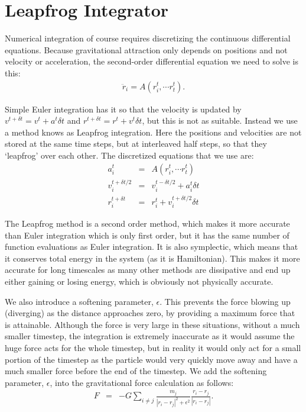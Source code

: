 \documentclass[11pt]{article}
\begin{document}
\section{Leapfrog Integrator}
Numerical integration of course requires discretizing the continuous differential equations.  
Because gravitational attraction only depends on positions and not velocity or acceleration, the second-order differential equation we need to solve is this:
\begin{eqnarray}
	\ddot r_i = A(r_i^t, \cdots r_t^t).
\end{eqnarray}

Simple Euler integration has it so that the velocity is updated by $v^{t+\delta t} = v^{t} + a^{t} \delta t$ and $r^{t+\delta t} = r^{t} + v^{t} \delta t$, but this is not as suitable.
Instead we use a method knows as Leapfrog integration.
Here the positions and velocities are not stored at the same time steps, but at interleaved half steps, so that  they `leapfrog' over each other.
The discretized equations that we use are:
\begin{eqnarray}
	a_i^t &=& A(r_i^t, \cdots r_t^t) \\
	v_i^{t+\delta t/2} &=& v_i^{t-\delta t/2} + a_i^t \delta t \\
	r_i^{t+\delta t} &=& r_i^t + v_i^{t+\delta t/2} \delta t
\end{eqnarray}

The Leapfrog method is a second order method, which makes it more accurate than Euler integration which is only first order, but it has the same number of function evaluations as Euler integration.
It is also symplectic, which means that it conserves total energy in the system (as it is Hamiltonian).
This makes it more accurate for long timescales as many other methods are dissipative and end up either gaining or losing energy, which is obviously not physically accurate.

We also introduce a softening parameter, $\epsilon$.
This prevents the force blowing up (diverging) as the distance approaches zero, by providing a maximum force that is attainable.
Although the force is very large in these situations, without a much smaller timestep, the integration is extremely inaccurate as it would assume the huge force acts for the whole timestep, but in reality it would only act for a small portion of the timestep as the particle would very quickly move away and have a much smaller force before the end of the timestep.
We add the softening parameter, $\epsilon$, into the gravitational force calculation as follows:
\begin{eqnarray}
	F &=& -G \sum_{i \neq j} \frac{m_j}{|r_i - r_j|^2 + \epsilon^2} \frac{r_i - r_j}{|r_i - r_j|}.
\end{eqnarray}
\end{document}
